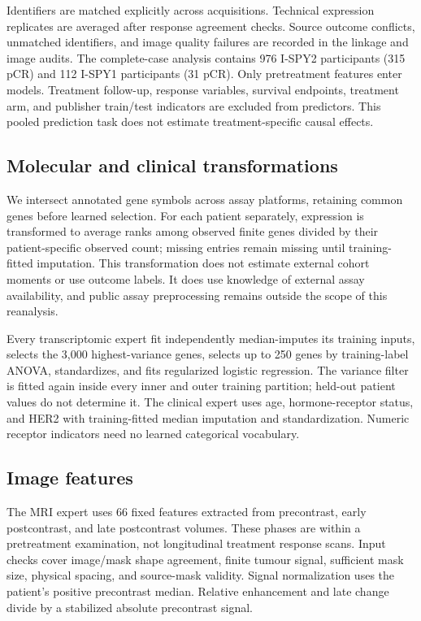 \documentclass[runningheads]{llncs}
\begin{document}
Identifiers are matched explicitly across acquisitions. Technical expression replicates are averaged after response agreement checks. Source outcome conflicts, unmatched identifiers, and image quality failures are recorded in the linkage and image audits. The complete-case analysis contains 976 I-SPY2 participants (315 pCR) and 112 I-SPY1 participants (31 pCR). Only pretreatment features enter models. Treatment follow-up, response variables, survival endpoints, treatment arm, and publisher train/test indicators are excluded from predictors. This pooled prediction task does not estimate treatment-specific causal effects.

\subsection{Molecular and clinical transformations}
We intersect annotated gene symbols across assay platforms, retaining \CommonGenes{} common genes before learned selection. For each patient separately, expression is transformed to average ranks among observed finite genes divided by their patient-specific observed count; missing entries remain missing until training-fitted imputation. This transformation does not estimate external cohort moments or use outcome labels. It does use knowledge of external assay availability, and public assay preprocessing remains outside the scope of this reanalysis.

Every transcriptomic expert fit independently median-imputes its training inputs, selects the 3,000 highest-variance genes, selects up to 250 genes by training-label ANOVA, standardizes, and fits regularized logistic regression. The variance filter is fitted again inside every inner and outer training partition; held-out patient values do not determine it. The clinical expert uses age, hormone-receptor status, and HER2 with training-fitted median imputation and standardization. Numeric receptor indicators need no learned categorical vocabulary.

\subsection{Image features}
The MRI expert uses 66 fixed features extracted from precontrast, early postcontrast, and late postcontrast volumes. These phases are within a pretreatment examination, not longitudinal treatment response scans. Input checks cover image/mask shape agreement, finite tumour signal, sufficient mask size, physical spacing, and source-mask validity. Signal normalization uses the patient's positive precontrast median. Relative enhancement and late change divide by a stabilized absolute precontrast signal.
\end{document}
